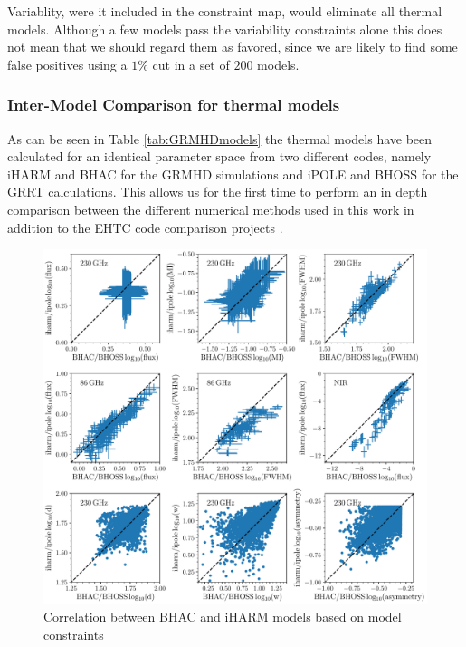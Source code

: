 Variablity, were it included in the constraint map, would eliminate all thermal models.  Although a few models pass the variability constraints alone this does not mean that we should regard them as favored, since we are likely to find some false positives using a $1\%$ cut in a set of $200$ models.

\subsubsection{Inter-Model Comparison for thermal models}

As can be seen in Table \ref{tab:GRMHDmodels} the thermal models have been calculated for an identical parameter space from two different codes, namely iHARM and BHAC for the GRMHD simulations and iPOLE and BHOSS for the GRRT calculations. This allows us for the first time to perform an in depth comparison between the different numerical methods used in this work in addition to the EHTC code comparison projects \citep{2019ApJS..243...26P,2020ApJ...897..148G}.

\begin{figure}
  \centering
  \includegraphics[width=\columnwidth]{./figures/BHAC_iharm_correlation}
  \caption{Correlation between BHAC and iHARM models based on model constraints}
  \label{fig:modelcorrelation}
\end{figure}

